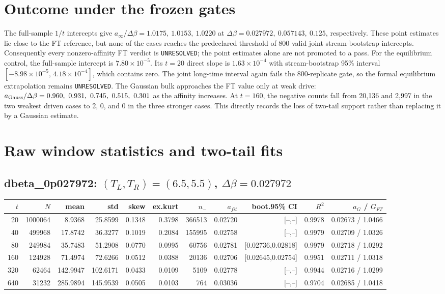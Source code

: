 \documentclass[10pt]{article}
\begin{document}
\section*{Outcome under the frozen gates}
The full-sample $1/t$ intercepts give $a_\infty/\Delta\beta=1.0175,\ 1.0153,\ 1.0220$ at $\Delta\beta=0.027972,\ 0.057143,\ 0.125$, respectively.  These point estimates lie close to the FT reference, but none of the cases reaches the predeclared threshold of 800 valid joint stream-bootstrap intercepts.  Consequently every nonzero-affinity FT verdict is \texttt{UNRESOLVED}; the point estimates alone are not promoted to a pass.
For the equilibrium control, the full-sample intercept is $7.80\times10^{-5}$.  Its $t=20$ direct slope is $1.63\times10^{-4}$ with stream-bootstrap 95\% interval $[-8.98\times10^{-5},\,4.18\times10^{-4}]$, which contains zero.  The joint long-time interval again fails the 800-replicate gate, so the formal equilibrium extrapolation remains \texttt{UNRESOLVED}.
The Gaussian bulk approaches the FT value only at weak drive: $a_{\rm Gauss}/\Delta\beta=0.960,\ 0.931,\ 0.745,\ 0.515,\ 0.301$ as the affinity increases.  At $t=160$, the negative counts fall from 20,136 and 2,997 in the two weakest driven cases to 2, 0, and 0 in the three stronger cases.  This directly records the loss of two-tail support rather than replacing it by a Gaussian estimate.
\section*{Raw window statistics and two-tail fits}
\subsection*{dbeta\_0p027972: $(T_L,T_R)=(6.5,5.5)$, $\Delta\beta=0.027972$}
\scriptsize\begin{longtable}{rrrrrrrrrrr}
\toprule $t$ & $N$ & mean & std & skew & ex.kurt & $n_-$ & $a_{fit}$ & boot.95\% CI & $R^2$ & $a_G$ / $G_{FT}$ \\
\midrule\endhead
20 & 1000064 & 8.9368 & 25.8599 & 0.1348 & 0.3798 & 366513 & 0.02720 & [--,--] & 0.9978 & 0.02673 / 1.0466 \\
40 & 499968 & 17.8742 & 36.3277 & 0.1019 & 0.2084 & 155995 & 0.02758 & [--,--] & 0.9979 & 0.02709 / 1.0326 \\
80 & 249984 & 35.7483 & 51.2908 & 0.0770 & 0.0995 & 60756 & 0.02781 & [0.02736,0.02818] & 0.9979 & 0.02718 / 1.0292 \\
160 & 124928 & 71.4974 & 72.6266 & 0.0512 & 0.0388 & 20136 & 0.02706 & [0.02645,0.02754] & 0.9951 & 0.02711 / 1.0318 \\
320 & 62464 & 142.9947 & 102.6171 & 0.0433 & 0.0109 & 5109 & 0.02778 & [--,--] & 0.9944 & 0.02716 / 1.0299 \\
640 & 31232 & 285.9894 & 145.9539 & 0.0505 & 0.0103 & 764 & 0.03036 & [--,--] & 0.9704 & 0.02685 / 1.0418 \\
\bottomrule\end{longtable}\normalsize
\end{document}
